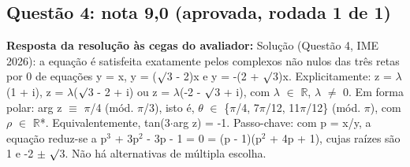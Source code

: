 \documentclass{article}%
\begin{document}
\subsection*{Questão 4: nota 9,0 (aprovada, rodada 1 de 1)}%
\textbf{Resposta da resolução às cegas do avaliador:} Solução (Questão 4, IME 2026): a equação é satisfeita exatamente pelos complexos não nulos das três retas por 0 de equações y = x, y = ($\surd$3 - 2)x e y = -(2 + $\surd$3)x. Explicitamente:\newline%
\newline%
z = $\lambda$(1 + i), z = $\lambda$($\surd$3 - 2 + i) ou z = $\lambda$(-2 - $\surd$3 + i), com $\lambda$ $\in$ $\mathbb{R}$, $\lambda$ $\neq$ 0.\newline%
\newline%
Em forma polar: arg z $\equiv$ $\pi$/4 (mód. $\pi$/3), isto é, $\theta$ $\in$ \{$\pi$/4, 7$\pi$/12, 11$\pi$/12\} (mód. $\pi$), com $\rho$ $\in$ $\mathbb{R}$*. Equivalentemente, tan(3$\cdot$arg z) = -1.\newline%
\newline%
Passo{-}chave: com p = x/y, a equação reduz{-}se a p$^3$ + 3p$^2$ - 3p - 1 = 0 = (p - 1)(p$^2$ + 4p + 1), cujas raízes são 1 e -2 $\pm$ $\surd$3. Não há alternativas de múltipla escolha.\par %
\end{document}
